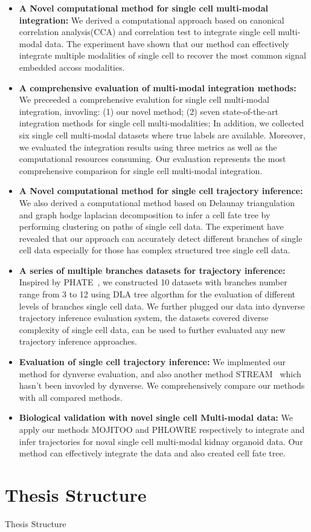 \begin{itemize}
	\item \textbf{A Novel computational method for single cell multi-modal integration:} We derived a computational approach based on canonical correlation analysis(CCA) and correlation test to integrate single cell multi-modal data. The experiment have shown that our method can effectively integrate multiple modalities of single cell to recover the most common signal embedded accoss modalities.

	\item \textbf{A comprehensive evaluation of multi-modal integration methods:} We preceeded a comprehensive evalution for single cell multi-modal integration, invovling: (1) our novel method; (2) seven state-of-the-art integration methods for single cell multi-modalities; In addition, we collected six single cell multi-modal datasets where true labels are available. Moreover, we evaluated the integration results using three metrics as well as the computational resources consuming. Our evaluation represents the most comprehensive comparison for single cell multi-modal integration.

	\item \textbf{A Novel computational method for single cell trajectory inference:} We also derived a computational method based on Delaunay triangulation and graph hodge laplacian decomposition to infer a cell fate tree by performing clustering on paths of single cell data. The experiment have revealed that our approach can accurately detect different branches of single cell data especially for those has complex structured tree single cell data.

	\item \textbf{A series of multiple branches datasets for trajectory inference:} Inspired by PHATE~\citep{moon2017phate}, we constructed 10 datasets with branches number range from 3 to 12 using DLA tree algorthm for the evaluation of different levels of branches single cell data. We further plugged our data into dynverse trajectory inference evaluation system, the datasets covered diverse complexity of single cell data, can be used to further evaluated any new trajectory inference approaches.

	\item \textbf{Evaluation of single cell trajectory inference:} We implmented our method for dynverse evaluation, and also another method STREAM~\citep{chen2019stream} which hasn't been invovled by dynverse. We comprehensively compare our methods with all compared methods.

	\item \textbf{Biological validation with novel single cell Multi-modal data:} We apply our methods MOJITOO and PHLOWRE respectively to integrate and infer trajectories for noval single cell multi-modal kidnay organoid data. Our method can effectively integrate the data and also created cell fate tree.
\end{itemize}


\section{Thesis Structure}
\label{introduction:sec3.structure}
Thesis Structure
